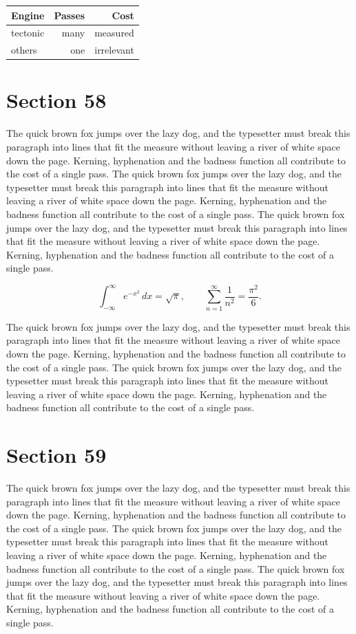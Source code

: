 \documentclass{article}
\begin{document}
\begin{center}
\begin{tabular}{lrr}
\toprule
Engine & Passes & Cost \\
\midrule
tectonic & many & measured \\
others & one & irrelevant \\
\bottomrule
\end{tabular}
\end{center}

\section{Section 58}
The quick brown fox jumps over the lazy dog, and the typesetter must break this paragraph into lines that fit the measure without leaving a river of white space down the page. Kerning, hyphenation and the badness function all contribute to the cost of a single pass. The quick brown fox jumps over the lazy dog, and the typesetter must break this paragraph into lines that fit the measure without leaving a river of white space down the page. Kerning, hyphenation and the badness function all contribute to the cost of a single pass. The quick brown fox jumps over the lazy dog, and the typesetter must break this paragraph into lines that fit the measure without leaving a river of white space down the page. Kerning, hyphenation and the badness function all contribute to the cost of a single pass. 

\begin{equation}
\int_{-\infty}^{\infty} e^{-x^{2}}\,dx = \sqrt{\pi}, \qquad
\sum_{n=1}^{\infty} \frac{1}{n^{2}} = \frac{\pi^{2}}{6}.
\end{equation}

The quick brown fox jumps over the lazy dog, and the typesetter must break this paragraph into lines that fit the measure without leaving a river of white space down the page. Kerning, hyphenation and the badness function all contribute to the cost of a single pass. The quick brown fox jumps over the lazy dog, and the typesetter must break this paragraph into lines that fit the measure without leaving a river of white space down the page. Kerning, hyphenation and the badness function all contribute to the cost of a single pass. 
\section{Section 59}
The quick brown fox jumps over the lazy dog, and the typesetter must break this paragraph into lines that fit the measure without leaving a river of white space down the page. Kerning, hyphenation and the badness function all contribute to the cost of a single pass. The quick brown fox jumps over the lazy dog, and the typesetter must break this paragraph into lines that fit the measure without leaving a river of white space down the page. Kerning, hyphenation and the badness function all contribute to the cost of a single pass. The quick brown fox jumps over the lazy dog, and the typesetter must break this paragraph into lines that fit the measure without leaving a river of white space down the page. Kerning, hyphenation and the badness function all contribute to the cost of a single pass. 
\end{document}
